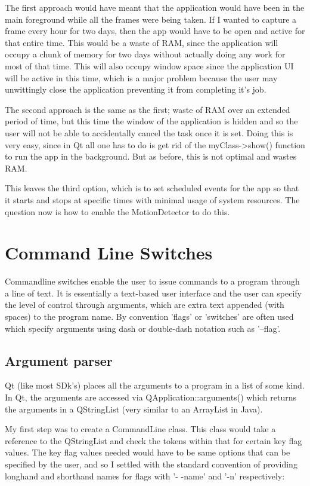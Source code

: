 The first approach would have meant that the application would have been in the main foreground while all the frames were being taken. If I wanted to capture a frame every hour for two days, then the app would have to be open and active for that entire time. This would be a waste of RAM, since the application will occupy a chunk of memory for two days without actually doing any work for most of that time. This will also occupy window space since the application UI will be active in this time, which is a major problem because the user may unwittingly close the application preventing it from completing it's job.

The second approach is the same as the first; waste of RAM over an extended period of time, but this time the window of the application is hidden and so the user will not be able to accidentally cancel the task once it is set. Doing this is very easy, since in Qt all one has to do is get rid of the myClass->show() function to run the app in the background. But as before, this is not optimal and wastes RAM.

This leaves the third option, which is to set scheduled events for the app so that it starts and stops at specific times with minimal usage of system resources. The question now is how to enable the MotionDetector to do this.

\section{Command Line Switches}

Commandline switches enable the user to issue commands to a program through a line of text. It is essentially a text-based user interface and the user can specify the level of control through arguments, which are extra text appended (with spaces) to the program name. By convention 'flags' or 'switches' are often used which specify arguments using dash or double-dash notation such as '--flag'.

\subsection{Argument parser}

Qt (like most SDk's) places all the arguments to a program in a list of some kind. In Qt, the arguments are accessed via QApplication::arguments() which returns the arguments in a QStringList (very similar to an ArrayList in Java).

My first step was to create a CommandLine class. This class would take a reference to the QStringList and check the tokens within that for certain key flag values. The key flag values needed would have to be same options that can be specified by the user, and so I settled with the standard convention of providing longhand and shorthand names for flags with '- -name' and '-n' respectively:
\begin{frame}[fragile]

\label{frame:help}
\end{frame}

